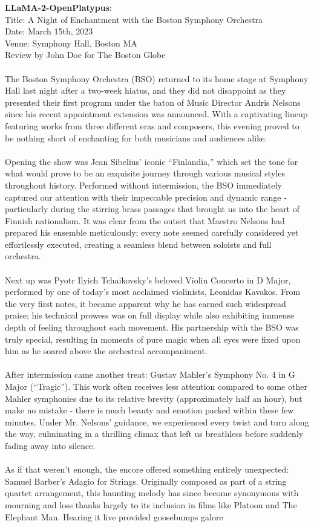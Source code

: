 \documentclass{article} %
\newcommand{\llama}{LLaMA}
\begin{document}
\begin{tcolorbox}[breakable,boxrule=0pt]
  \textbf{\llama{}-2-OpenPlatypus}: \\Title: A Night of Enchantment with the Boston Symphony Orchestra\\Date: March 15th, 2023\\Venue: Symphony Hall, Boston MA\\Review by John Doe for The Boston Globe\\\\The Boston Symphony Orchestra (BSO) returned to its home stage at Symphony Hall last night after a two-week hiatus, and they did not disappoint as they presented their first program under the baton of Music Director Andris Nelsons since his recent appointment extension was announced. With a captivating lineup featuring works from three different eras and composers, this evening proved to be nothing short of enchanting for both musicians and audiences alike.\\\\Opening the show was Jean Sibelius' iconic ``Finlandia,'' which set the tone for what would prove to be an exquisite journey through various musical styles throughout history. Performed without intermission, the BSO immediately captured our attention with their impeccable precision and dynamic range - particularly during the stirring brass passages that brought us into the heart of Finnish nationalism. It was clear from the outset that Maestro Nelsons had prepared his ensemble meticulously; every note seemed carefully considered yet effortlessly executed, creating a seamless blend between soloists and full orchestra.\\\\Next up was Pyotr Ilyich Tchaikovsky's beloved Violin Concerto in D Major, performed by one of today's most acclaimed violinists, Leonidas Kavakos. From the very first notes, it became apparent why he has earned such widespread praise; his technical prowess was on full display while also exhibiting immense depth of feeling throughout each movement. His partnership with the BSO was truly special, resulting in moments of pure magic when all eyes were fixed upon him as he soared above the orchestral accompaniment.\\\\After intermission came another treat: Gustav Mahler's Symphony No. 4 in G Major (``Tragic''). This work often receives less attention compared to some other Mahler symphonies due to its relative brevity (approximately half an hour), but make no mistake - there is much beauty and emotion packed within these few minutes. Under Mr. Nelsons' guidance, we experienced every twist and turn along the way, culminating in a thrilling climax that left us breathless before suddenly fading away into silence.\\\\As if that weren't enough, the encore offered something entirely unexpected: Samuel Barber's Adagio for Strings. Originally composed as part of a string quartet arrangement, this haunting melody has since become synonymous with mourning and loss thanks largely to its inclusion in films like Platoon and The Elephant Man. Hearing it live provided goosebumps galore 
\end{tcolorbox}
\end{document}
